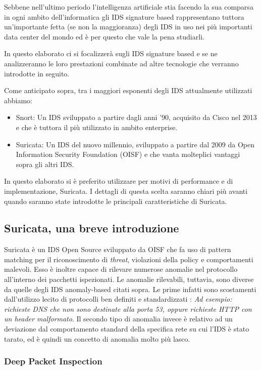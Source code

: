 \documentclass[12pt,a4paper,openright,twoside]{report}
\begin{document}
Sebbene nell'ultimo periodo l'intelligenza artificiale stia facendo la sua comparsa in ogni
ambito dell'informatica gli IDS signature based rappresentano tuttora un'importante
fetta (se non la maggioranza) degli IDS in uso nei pi\`u importanti data center del mondo
ed \`e per questo che vale la pena studiarli.

In questo elaborato ci si focalizzer\`a sugli IDS signature based e se ne analizzeranno
le loro prestazioni combinate ad altre tecnologie che verranno introdotte in seguito.

Come anticipato sopra, tra i maggiori esponenti degli IDS attualmente utilizzati abbiamo:
\begin{itemize}
  \item Snort: Un IDS sviluppato a partire dagli anni '90, acquisito da Cisco nel 2013 e
  che \`e tuttora il pi\`u utilizzato in ambito enterprise.
  \item Suricata: Un IDS del nuovo millennio, sviluppato a partire dal 2009 da
  Open Information Security Foundation (OISF) e che vanta molteplici vantaggi sopra gli altri IDS.
\end{itemize}

In questo elaborato si \`e preferito utilizzare per motivi di performance e di implementazione,
Suricata. I dettagli di questa scelta saranno chiari pi\`u avanti quando saranno state
introdotte le principali caratteristiche di Suricata.

\subsection{Suricata, una breve introduzione}

Suricata \`e un IDS Open Source sviluppato da OISF che fa uso di pattern matching per
il riconoscimento di {\it threat}, violazioni della policy e comportamenti malevoli.
Esso \`e inoltre capace di rilevare numerose anomalie nel protocollo all'interno dei
pacchetti ispezionati. Le anomalie rilevabili, tuttavia, sono diverse da
quelle degli IDS anomaly-based citati sopra. Le prime infatti sono
scostamenti dall'utilizzo lecito di protocolli ben definiti e standardizzati :
{\it Ad esempio: richieste DNS che non sono destinate alla porta 53, oppure
richieste HTTP con un header malformato}. Il secondo tipo di anomalia invece \`e
relativo ad un deviazione dal comportamento standard della specifica rete su cui l'IDS
\`e stato tarato, ed \`e quindi un concetto di anomalia molto pi\`u lasco.

\subsubsection{Deep Packet Inspection}
\end{document}
